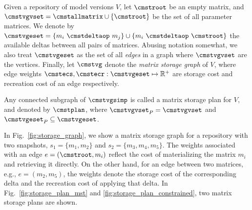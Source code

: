 \documentclass[conference]{IEEEtran}
\begin{document}
\begin{definition} Given a repository of model versions $V$, let $\cmstroot$ be an empty matrix, and $\cmstvgvset = \cmstallmatrix \cup \{\cmstroot\}$ be the set of all parameter matrices. We denote by $\cmstvgeset = \{m_i\ \cmstdeltaop\ m_j \} \cup \{ m_i\ \cmstdeltaop\ \cmstroot\}$ the available deltas between all pairs of matrices. Abusing notation somewhat, we also treat $\cmstvgeset$ as the set of all {\em edges} in a graph where $\cmstvgvset$ are the vertices. Finally, let $\cmstvg$ denote the {\em matrix storage graph} of $V$, 
where edge weights $\cmstecs, \cmstecr: \cmstvgeset \mapsto \mathbb{R^+}$ are storage cost and recreation cost of an edge respectively.
\end{definition}


\begin{definition} Any connected subgraph of $\cmstvgsimp$ is called a matrix storage plan for $V$, and denoted by $\cmstplan$, where $\cmstvgvset_P = \cmstvgvset$ and $\cmstvgeset_P \subseteq \cmstvgeset$.
\end{definition}

\begin{example}
In Fig.~\ref{fig:storage_graph}, we show a matrix storage graph for a repository with two snapshots, $s_1 =\{m_1,m_2\}$ and $s_2 =\{m_3,m_4,m_5\}$. The weights associated with an edge $e = (\cmstroot, m_i)$ reflect the cost of materializing the matrix $m_i$ and retrieving it directly. On the other hand, for an edge between two matrices, e.g., $e = (m_2, m_5)$, the weights denote the storage cost of the corresponding delta and the recreation cost of applying that delta. In Fig.~\ref{fig:storage_plan_mst} and \ref{fig:storage_plan_constrained}, two matrix storage plans are shown. %
\end{example}
\end{document}
